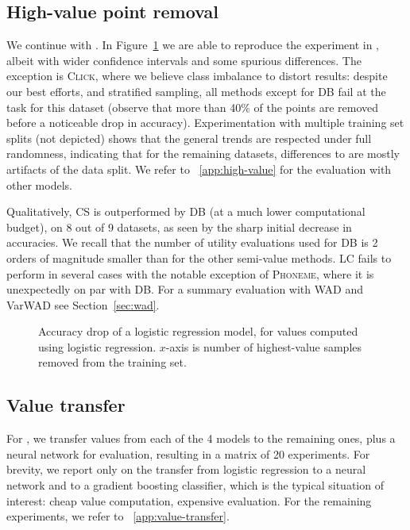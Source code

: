 \documentclass[10pt]{article}
\newcommand{\tmname}[1]{\textsc{#1}}
\begin{document}
\subsection{High-value point removal}\label{sec:high-value}

We continue with . In  Figure~\ref{fig:acc-lr-lr}
we are able to reproduce the experiment in {\cite{schoch_csshapley_2022}},
albeit with wider confidence intervals and some spurious differences. The
exception is {\tmname{Click}}, where we believe class imbalance to distort
results: despite our best efforts, and stratified sampling, all methods except
for DB fail at the task for this dataset (observe that more than 40\% of the
points are removed before a noticeable drop in accuracy). Experimentation with
multiple training set splits (not depicted) shows that the general trends are
respected under full randomness, indicating that for the remaining datasets,
differences to {\cite{schoch_csshapley_2022}} are mostly artifacts of the
data split. We refer to ~\ref{app:high-value} for the evaluation with other
models.

Qualitatively, CS is outperformed by DB (at a much lower computational
budget), on 8 out of 9 datasets, as seen by the sharp initial decrease in
accuracies. We recall that the number of utility evaluations used for DB is 2
orders of magnitude smaller than for the other semi-value methods. LC fails to
perform in several cases with the notable exception of {\tmname{Phoneme}},
where it is unexpectedly on par with DB. For a summary evaluation with WAD and
VarWAD see  Section~\ref{sec:wad}.

\begin{figure}[h]
  \caption{\label{fig:acc-lr-lr}Accuracy drop of a logistic regression model,
  for values computed using logistic regression. $x$-axis is number of
  highest-value samples removed from the training set.}
\end{figure}

\subsection{Value transfer}\label{sec:value-transfer}

For , we transfer values from each of the 4
models to the remaining ones, plus a neural network for evaluation, resulting
in a matrix of 20 experiments. For brevity, we report only on the transfer
from logistic regression to a neural network and to a gradient boosting
classifier, which is the typical situation of interest: cheap value
computation, expensive evaluation. For the remaining experiments, we refer to
~\ref{app:value-transfer}.
\end{document}
